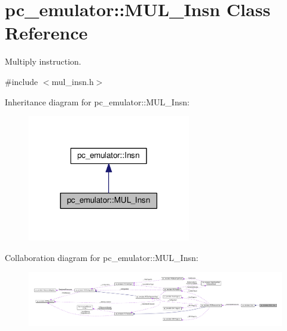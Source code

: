 \hypertarget{classpc__emulator_1_1MUL__Insn}{}\section{pc\+\_\+emulator\+:\+:M\+U\+L\+\_\+\+Insn Class Reference}
\label{classpc__emulator_1_1MUL__Insn}


Multiply instruction.  




{\ttfamily \#include $<$mul\+\_\+insn.\+h$>$}



Inheritance diagram for pc\+\_\+emulator\+:\+:M\+U\+L\+\_\+\+Insn\+:\nopagebreak
\begin{figure}[H]
\begin{center}
\leavevmode
\includegraphics[width=201pt]{classpc__emulator_1_1MUL__Insn__inherit__graph}
\end{center}
\end{figure}


Collaboration diagram for pc\+\_\+emulator\+:\+:M\+U\+L\+\_\+\+Insn\+:\nopagebreak
\begin{figure}[H]
\begin{center}
\leavevmode
\includegraphics[width=350pt]{classpc__emulator_1_1MUL__Insn__coll__graph}
\end{center}
\end{figure}
